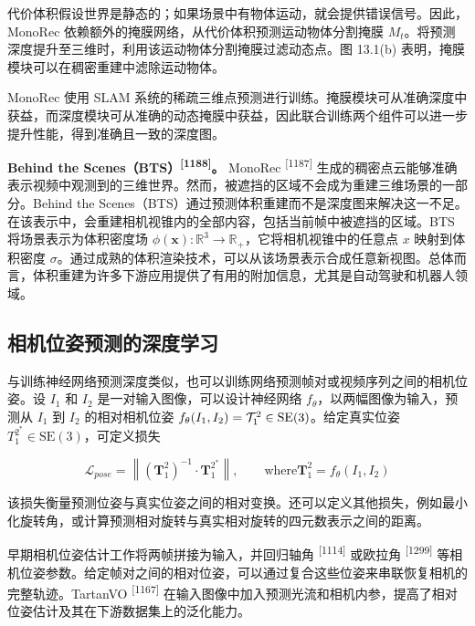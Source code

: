 代价体积假设世界是静态的；如果场景中有物体运动，就会提供错误信号。因此，MonoRec 依赖额外的掩膜网络，从代价体积预测运动物体分割掩膜 $M_t$。将预测深度提升至三维时，利用该运动物体分割掩膜过滤动态点。图 13.1(b) 表明，掩膜模块可以在稠密重建中滤除运动物体。

MonoRec 使用 SLAM 系统的稀疏三维点预测进行训练。掩膜模块可从准确深度中获益，而深度模块可从准确的动态掩膜中获益，因此联合训练两个组件可以进一步提升性能，得到准确且一致的深度图。

\textbf{Behind the Scenes（BTS）\textsuperscript{[1188]}。} MonoRec \textsuperscript{[1187]} 生成的稠密点云能够准确表示视频中观测到的三维世界。然而，被遮挡的区域不会成为重建三维场景的一部分。Behind the Scenes（BTS）通过预测体积重建而不是深度图来解决这一不足。在该表示中，会重建相机视锥内的全部内容，包括当前帧中被遮挡的区域。BTS 将场景表示为体积密度场 $\phi ( \pmb { x } ) : \mathbb { R } ^ { 3 } \to \mathbb { R } _ { + }$，它将相机视锥中的任意点 $x$ 映射到体积密度 $\sigma$。通过成熟的体积渲染技术，可以从该场景表示合成任意新视图。总体而言，体积重建为许多下游应用提供了有用的附加信息，尤其是自动驾驶和机器人领域。

\subsection{相机位姿预测的深度学习}

与训练神经网络预测深度类似，也可以训练网络预测帧对或视频序列之间的相机位姿。设 $I _ { 1 }$ 和 $I _ { 2 }$ 是一对输入图像，可以设计神经网络 $f _ { \theta }$，以两幅图像为输入，预测从 $I _ { 1 }$ 到 $I _ { 2 }$ 的相对相机位姿 $f _ { \theta } ( I _ { 1 } , I _ { 2 } ) = { \cal T } _ { 1 } ^ { 2 } \in \mathrm { S E } ( 3 )$。给定真实位姿 $T _ { 1 } ^ { 2 ^ { * } } \in \mathrm { S E } ( 3 )$，可定义损失

\begin{equation}
\mathcal {L} _ {p o s e} = \left\| \left(\boldsymbol {T} _ {1} ^ {2}\right) ^ {- 1} \cdot \boldsymbol {T} _ {1} ^ {2 ^ {*}} \right\|, \qquad \mathrm{where} \boldsymbol {T} _ {1} ^ {2} = f _ {\theta} (I _ {1}, I _ {2})\tag{13.1}
\end{equation}

该损失衡量预测位姿与真实位姿之间的相对变换。还可以定义其他损失，例如最小化旋转角，或计算预测相对旋转与真实相对旋转的四元数表示之间的距离。

早期相机位姿估计工作将两帧拼接为输入，并回归轴角 \textsuperscript{[1114]} 或欧拉角 \textsuperscript{[1299]} 等相机位姿参数。给定帧对之间的相对位姿，可以通过复合这些位姿来串联恢复相机的完整轨迹。TartanVO \textsuperscript{[1167]} 在输入图像中加入预测光流和相机内参，提高了相对位姿估计及其在下游数据集上的泛化能力。

